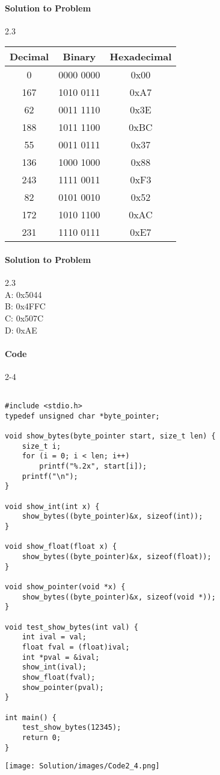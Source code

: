\documentclass{report}
\begin{document}
\paragraph{Solution to Problem} 2.3
\begin{center}
\begin{tabular}{ |c|c|c| } 
\hline
Decimal & Binary & Hexadecimal \\
\hline\hline
0 & 0000 0000 & 0x00 \\
\hline
167 & 1010 0111 & 0xA7 \\
\hline
62 &  0011 1110 & 0x3E \\
\hline
188 & 1011 1100 & 0xBC  \\
\hline
55 & 0011 0111 & 0x37  \\
\hline
136 & 1000 1000 & 0x88 \\
\hline
243 & 1111 0011 & 0xF3 \\
\hline
82 & 0101 0010 & 0x52 \\
\hline
172 & 1010 1100 & 0xAC \\
\hline
231 & 1110 0111 & 0xE7  \\
\hline
\end{tabular}
\end{center}

\paragraph{Solution to Problem} 2.3 \\
A: 0x5044  \\
B: 0x4FFC  \\ 
C: 0x507C  \\
D: 0xAE  \\

\paragraph{Code} 2-4

\begin{lstlisting}

#include <stdio.h>
typedef unsigned char *byte_pointer;

void show_bytes(byte_pointer start, size_t len) {
	size_t i;
	for (i = 0; i < len; i++)
		printf("%.2x", start[i]);
	printf("\n");
}

void show_int(int x) {
	show_bytes((byte_pointer)&x, sizeof(int));
}

void show_float(float x) {
	show_bytes((byte_pointer)&x, sizeof(float));
}

void show_pointer(void *x) {
	show_bytes((byte_pointer)&x, sizeof(void *));
}

void test_show_bytes(int val) {
	int ival = val;
	float fval = (float)ival;
	int *pval = &ival;
	show_int(ival);
	show_float(fval);
	show_pointer(pval);
}

int main() {
	test_show_bytes(12345);
	return 0;
}

\end{lstlisting}
\texttt{[image: Solution/images/Code2\_4.png]}
\end{document}
